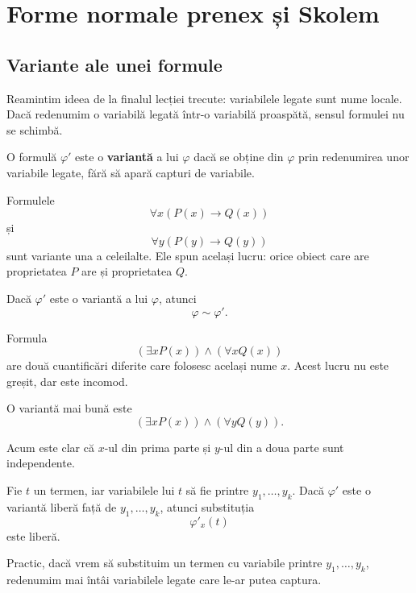 \chapter{Forme normale prenex și Skolem}

\section{Variante ale unei formule}

Reamintim ideea de la finalul lecției trecute: variabilele legate sunt nume locale. Dacă redenumim o variabilă legată într-o variabilă proaspătă, sensul formulei nu se schimbă.

\begin{definition}
	O formulă \( \varphi' \) este o \textbf{variantă} a lui \( \varphi \) dacă se obține din \( \varphi \) prin redenumirea unor variabile legate, fără să apară capturi de variabile.
\end{definition}

\begin{eg}
	Formulele
	\[
		\forall x(P(x) \to Q(x))
	\]
	și
	\[
		\forall y(P(y) \to Q(y))
	\]
	sunt variante una a celeilalte. Ele spun același lucru: orice obiect care are proprietatea \(P\) are și proprietatea \(Q\).
\end{eg}

\begin{prop}
	Dacă \( \varphi' \) este o variantă a lui \( \varphi \), atunci
	\[
		\varphi \sim \varphi'.
	\]
\end{prop}

\begin{eg}
	Formula
	\[
		(\exists x P(x)) \land (\forall x Q(x))
	\]
	are două cuantificări diferite care folosesc același nume \(x\). Acest lucru nu este greșit, dar este incomod.

	O variantă mai bună este
	\[
		(\exists x P(x)) \land (\forall y Q(y)).
	\]

	Acum este clar că \(x\)-ul din prima parte și \(y\)-ul din a doua parte sunt independente.
\end{eg}

\begin{prop}
	Fie \(t\) un termen, iar variabilele lui \(t\) să fie printre \(y_1,\dots,y_k\). Dacă \( \varphi' \) este o variantă liberă față de \(y_1,\dots,y_k\), atunci substituția
	\[
		\varphi'_x(t)
	\]
	este liberă.
\end{prop}

Practic, dacă vrem să substituim un termen cu variabile printre
\(y_1,\dots,y_k\), redenumim mai întâi variabilele legate care le-ar putea captura.

